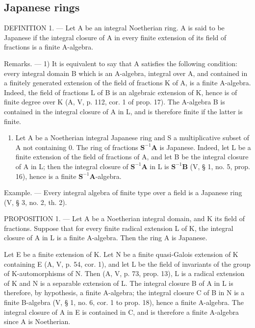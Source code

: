 \subsection{Japanese rings}

DEFINITION 1. --- Let A be an integral Noetherian ring. A is said to be Japanese if the integral closure of A in every finite extension of its field of fractions is a finite A-algebra.

Remarks. --- 1) It is equivalent to say that A satisfies the following condition: every integral domain B which is an A-algebra, integral over A, and contained in a finitely generated extension of the field of fractions K of A, is a finite A-algebra. Indeed, the field of fractions L of B is an algebraic extension of K, hence is of finite degree over K (A, V, p. 112, cor. 1 of prop. 17). The A-algebra B is contained in the integral closure of A in L, and is therefore finite if the latter is finite.

\begin{enumerate}
\def\labelenumi{\arabic{enumi})}
\setcounter{enumi}{1}
\tightlist
\item
  Let A be a Noetherian integral Japanese ring and S a multiplicative subset of A not containing 0. The ring of fractions \(\mathbf{S}^{-1}\mathbf{A}\) is Japanese. Indeed, let L be a finite extension of the field of fractions of A, and let B be the integral closure of A in L; then the integral closure of \(\mathbf{S}^{-1}\mathbf{A}\) in L is \(\mathbf{S}^{-1}\mathbf{B}\) (V, § 1, no. 5, prop. 16), hence is a finite \(\mathbf{S}^{-1}\mathbf{A}\)-algebra.
\end{enumerate}

Example. --- Every integral algebra of finite type over a field is a Japanese ring (V, § 3, no. 2, th. 2).

PROPOSITION 1. --- Let A be a Noetherian integral domain, and K its field of fractions. Suppose that for every finite radical extension L of K, the integral closure of A in L is a finite A-algebra. Then the ring A is Japanese.

Let E be a finite extension of K. Let N be a finite quasi-Galois extension of K containing E (A, V, p. 54, cor. 1), and let L be the field of invariants of the group of K-automorphisms of N. Then (A, V, p. 73, prop. 13), L is a radical extension of K and N is a separable extension of L. The integral closure B of A in L is therefore, by hypothesis, a finite A-algebra; the integral closure C of B in N is a finite B-algebra (V, § 1, no. 6, cor. 1 to prop. 18), hence a finite A-algebra. The integral closure of A in E is contained in C, and is therefore a finite A-algebra since A is Noetherian.

